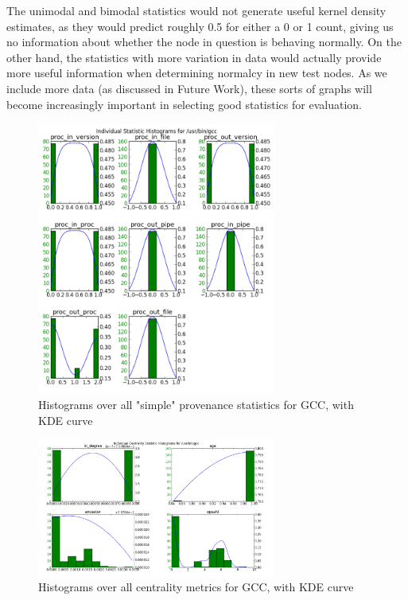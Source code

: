 \documentclass[10pt,twocolumn]{article}
\begin{document}
The unimodal and bimodal statistics would not generate useful kernel density estimates, as they would predict roughly 0.5 for either a 0 or 1 count, giving us no information about whether the node in question is behaving normally.  On the other hand, the statistics with more variation in data would actually provide more useful information when determining normalcy in new test nodes. As we include more data (as discussed in Future Work), these sorts of graphs will become increasingly important in selecting good statistics for evaluation.
\begin{figure}
  \label{simple-gcc}
  \caption{Histograms over all "simple" provenance statistics for GCC, with KDE curve}
  \centering
    \includegraphics[width=0.7\textwidth]{img/gcc_stats2.png}
\end{figure}
\begin{figure}
  \label{centrality-gcc}
  \caption{Histograms over all centrality metrics for GCC, with KDE curve}
  \centering
    \includegraphics[width=0.7\textwidth]{img/gcc_cent_stats2.png}
\end{figure}
\end{document}
